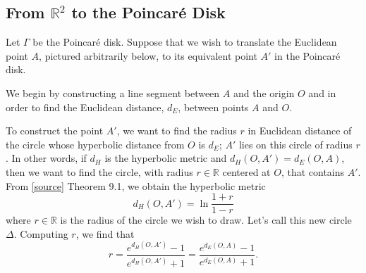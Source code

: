 \documentclass[12pt]{article}
\newcommand{\R}{\mathbb{R}}
\newcommand{\poincare}{Poincar\'{e} }
\theoremstyle{plain}
\theoremstyle{definition}
\begin{document}
\newpage
\begin{appendices}
\section{From $\R^2$ to the \poincare Disk} \label{appendixA}

Let $\Gamma$ be the \poincare disk. Suppose that we wish to translate the Euclidean point $A$, pictured arbitrarily below, to its equivalent point $A'$ in the \poincare disk.

\begin{center}
\end{center}

We begin by constructing a line segment between $A$ and the origin $O$ and in order to find the Euclidean distance, $d_E$, between points $A$ and $O$.

\begin{center}
\end{center}

To construct the point $A'$, we want to find the radius $r$ in Euclidean distance of the circle whose hyperbolic distance from $O$ is $d_E$; $A'$ lies on this circle of radius $r$. In other words, if $d_H$ is the hyperbolic metric and $d_H(O,A') = d_E(O,A)$, then we want to find the circle, with radius $r\in\R$ centered at $O$, that contains $A'$. From \href{}{[source]} Theorem 9.1, we obtain the hyperbolic metric
\[
	d_H(O,A') = \ln\frac{1 + r}{1 - r}
\]
where $r\in\R$ is the radius of the circle we wish to draw. Let's call this new circle $\Delta$. Computing $r$, we find that
\[
	r = \frac{e^{d_H(O,A')} - 1}{e^{d_H(O,A')} + 1} =  \frac{e^{d_E(O,A)} - 1}{e^{d_E(O,A)} + 1}.
\]

\vfill
\pagebreak


\end{appendices}
\end{document}

